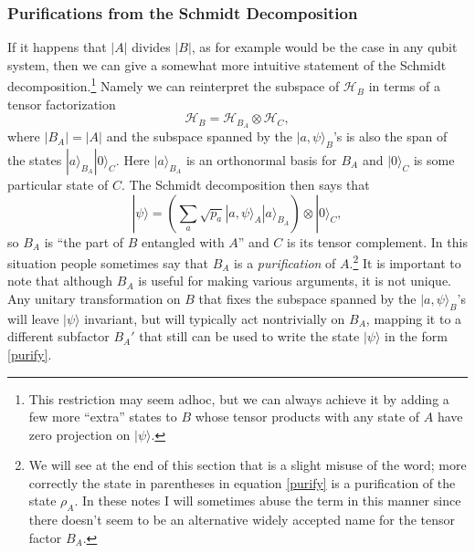 \documentclass[12pt]{article}
\newcommand{\be}{\begin{equation}}
\newcommand{\ee}{\end{equation}}
\newcommand{\HB}{\mathcal{H}_B}
\newcommand{\ran}{\rangle}
\begin{document}
\subsubsection{Purifications from the Schmidt Decomposition}\label{pursec}
If it happens that $|A|$ divides $|B|$, as for example would be the case in any qubit system, then we can give a somewhat more intuitive statement of the Schmidt decomposition.\footnote{This restriction may seem adhoc, but we can always achieve it by adding a few more ``extra'' states to $B$ whose tensor products with any state of $A$ have zero projection on $|\psi\ran$.}  Namely we can reinterpret the subspace of $\HB$ in terms of a tensor factorization
\be
\HB=\mathcal{H}_{B_A} \otimes \mathcal{H}_C, 
\ee 
where $|B_A|=|A|$ and the subspace spanned by the $|a,\psi\ran_B$'s is also the span of the states $|a\ran_{B_A}|0\ran_C$.  Here $|a\ran_{B_A}$ is an orthonormal basis for $B_A$ and $|0\ran_C$ is some particular state of $C$.  The Schmidt decomposition then says that
\be\label{purify}
|\psi\ran=\left(\sum_a \sqrt{p_a}|a,\psi\ran_A |a\ran_{B_A}\right)\otimes |0\ran_C,
\ee
so $B_A$ is ``the part of $B$ entangled with $A$'' and $C$ is its tensor complement.  In this situation people sometimes say that $B_A$ is a \textit{purification} of $A$.\footnote{We will see at the end of this section that is a slight misuse of the word; more correctly the state in parentheses in equation \eqref{purify} is a purification of the state $\rho_A$.  In these notes I will sometimes abuse the term in this manner since there doesn't seem to be an alternative widely accepted name for the tensor factor $B_A$.}  It is important to note that although $B_A$ is useful for making various arguments, it is not unique. Any unitary transformation on $B$ that fixes the subspace spanned by the $|a,\psi\ran_B$'s will leave $|\psi\ran$ invariant, but will typically act nontrivially on $B_A$, mapping it to a different subfactor $B_A'$ that still can be used to write the state $|\psi\ran$ in the form \eqref{purify}.
\end{document}
